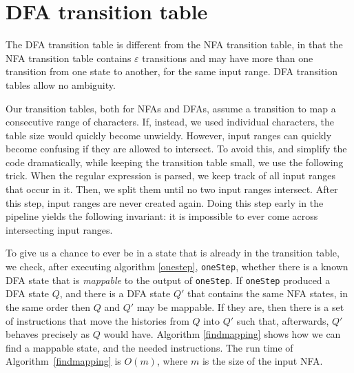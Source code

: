 \documentclass[11pt]{Thesis}
\theoremstyle{definition}
\begin{document}
\section{DFA transition table}
The DFA transition table is different from the NFA transition table,
in that the NFA transition table contains $\varepsilon$ transitions and
may have more than one transition from one state to another, for
the same input range. DFA transition tables allow no ambiguity.

Our transition tables, both for NFAs and DFAs, assume a transition
to map a consecutive range of characters. If, instead, we used
individual characters, the table size would quickly become unwieldy.
However, input ranges can quickly become confusing if they are
allowed to intersect. To avoid this, and simplify the code dramatically,
while keeping the transition table small, we use the following
trick. When the regular expression is parsed, we keep track of all
input ranges that occur in it. Then, we split them until no two
input ranges intersect.  After this step, input ranges are never
created again.  Doing this step early in the pipeline yields the
following invariant: it is impossible to ever come across intersecting
input ranges.

To give us a chance to ever be in a state that is already in the
transition table, we check, after executing algorithm \ref{onestep},
\texttt{oneStep}, whether there is a known DFA state that is
\emph{mappable} to the output of \texttt{oneStep}.  If \texttt{oneStep}
produced a DFA state $Q$, and there is a DFA state $Q'$ that contains
the same NFA states, in the same order then $Q$ and $Q'$ may be
mappable.  If they are, then there is a set of instructions that
move the histories from $Q$ into $Q'$ such that, afterwards, $Q'$
behaves precisely as $Q$ would have. Algorithm \ref{findmapping}
shows how we can find a mappable state, and the needed instructions.
The run time of Algorithm~\ref{findmapping} is $O(m)$, where $m$
is the size of the input NFA.
\end{document}
